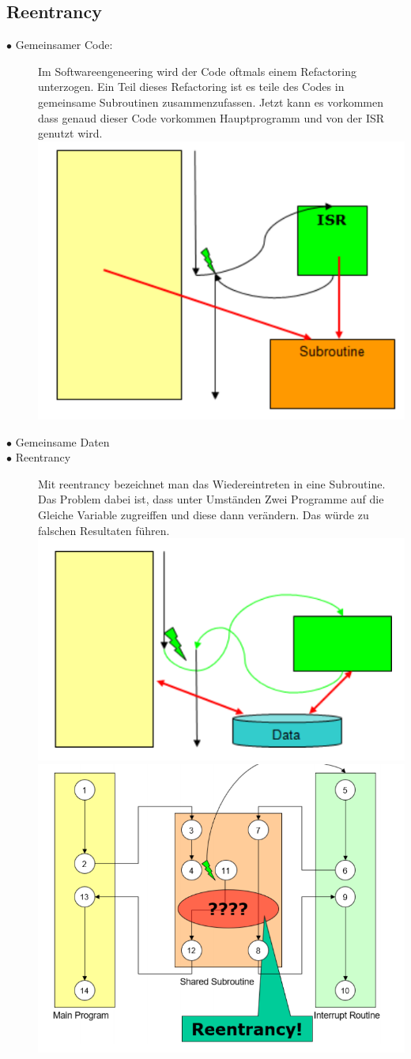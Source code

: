 \documentclass[a4paper, 8pt]{extarticle}
\begin{document}
\begin{multicols*}{3}
\begin{description}
					\end{description}
				\subsection{Reentrancy}
					\begin{description}
						\item[$\bullet$ Gemeinsamer Code:]
							Im Softwareengeneering wird der Code oftmals einem Refactoring unterzogen. Ein Teil dieses Refactoring ist es 
							teile des Codes in gemeinsame Subroutinen zusammenzufassen. Jetzt kann es vorkommen dass genaud dieser Code vorkommen
							Hauptprogramm und von der ISR genutzt wird.
							\includegraphics[width=0.6\linewidth,left]{img/Common_Subroutines.PNG}
							\item[$\bullet$ Gemeinsame Daten]
							\item[$\bullet$ Reentrancy] 
								Mit reentrancy bezeichnet man das Wiedereintreten in eine Subroutine. Das Problem dabei ist, dass unter Umständen
								Zwei Programme auf die Gleiche Variable zugreiffen und diese dann verändern. Das würde zu falschen Resultaten führen.
								\includegraphics[width=0.6\linewidth,left]{img/Common_Data.PNG}
								\includegraphics[width=0.6\linewidth,left]{img/Wieder_eintreten_gemeinsame_Subroutine.PNG}  

\end{description}
\end{multicols*}
\end{document}
